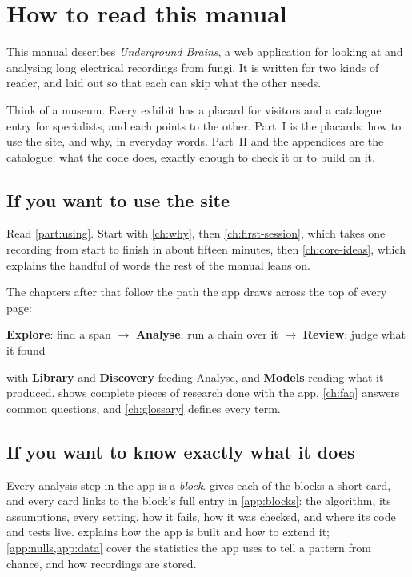 \chapter*{How to read this manual}

This manual describes \emph{Underground Brains}, a web application for looking at and
analysing long electrical recordings from fungi. It is written for two kinds of reader,
and laid out so that each can skip what the other needs.

\begin{plainterms}
Think of a museum. Every exhibit has a placard for visitors and a catalogue entry for
specialists, and each points to the other. Part~I is the placards: how to use the site, and
why, in everyday words. Part~II and the appendices are the catalogue: what the code does,
exactly enough to check it or to build on it.
\end{plainterms}

\section*{If you want to use the site}
Read \cref{part:using}. Start with \cref{ch:why}, then \cref{ch:first-session}, which takes
one recording from start to finish in about fifteen minutes, then \cref{ch:core-ideas},
which explains the handful of words the rest of the manual leans on.

The chapters after that follow the path the app draws across the top of every page:
\begin{center}\sffamily
\textbf{Explore}: find a span \enskip\ensuremath{\to}\enskip
\textbf{Analyse}: run a chain over it \enskip\ensuremath{\to}\enskip
\textbf{Review}: judge what it found
\end{center}
with \textbf{Library} and \textbf{Discovery} feeding Analyse, and \textbf{Models} reading
what it produced.  shows complete pieces of research done with the app,
\cref{ch:faq} answers common questions, and \cref{ch:glossary} defines every term.

\section*{If you want to know exactly what it does}
Every analysis step in the app is a \emph{block}.  gives each of the
\ubnumblocks{} blocks a short card, and every card links to the block's full entry in
\cref{app:blocks}: the algorithm, its assumptions, every setting, how it fails, how it was
checked, and where its code and tests live.  explains how the app is built
and how to extend it; \cref{app:nulls,app:data} cover the statistics the app uses to tell a
pattern from chance, and how recordings are stored.

